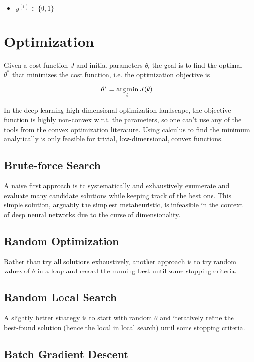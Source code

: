 \begin{itemize}
    \item $y^{(i)} \in \{0, 1\}$
\end{itemize}


\section{Optimization}

Given a cost function $J$ and initial parameters $\theta$, the goal is to find the optimal $\theta^*$ that minimizes the cost function, i.e. the optimization objective is

$$
\theta^{*} = \operatorname*{arg\,min}_{\theta} J(\theta)
$$

In the deep learning high-dimensional optimization landscape, the objective function is highly non-convex w.r.t. the parameters, so one can't use any of the tools from the convex optimization literature. Using calculus to find the minimum analytically is only feasible for trivial, low-dimensional, convex functions.

\subsection{Brute-force Search}

A naive first approach is to systematically and exhaustively enumerate and evaluate many candidate solutions while keeping track of the best one. This simple solution, arguably the simplest metaheuristic, is infeasible in the context of deep neural networks due to the curse of dimensionality.

\subsection{Random Optimization}

Rather than try all solutions exhaustively, another approach is to try random values of $\theta$ in a loop and record the running best until some stopping criteria.

\subsection{Random Local Search}

A slightly better strategy is to start with random $\theta$ and iteratively refine the best-found solution (hence the local in local search) until some stopping criteria.

\subsection{Batch Gradient Descent}

